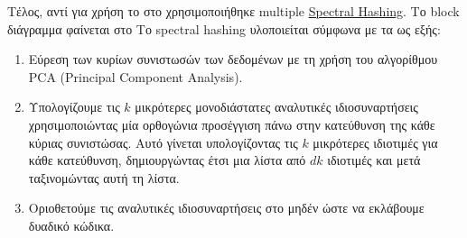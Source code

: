 Τέλος, αντί για χρήση \lsh{} το \citeyear{park2015query} στο \cite{park2015query} χρησιμοποιήθηκε multiple \href{https://en.wikipedia.org/wiki/Spectral_Hash}{Spectral Hashing}.
Το block διάγραμμα φαίνεται στο 
Το spectral hashing υλοποιείται σύμφωνα με τα \cite{weiss2009spectral,weiss2009spectral-blog} ως εξής:
\begin{enumerate}
	\item Εύρεση των κυρίων συνιστωσών των δεδομένων με τη χρήση του αλγορίθμου PCA (Principal Component Analysis).
	\item Υπολογίζουμε τις $k$ μικρότερες μονοδιάστατες αναλυτικές ιδιοσυναρτήσεις χρησιμοποιώντας μία ορθογώνια προσέγγιση πάνω στην κατεύθυνση της κάθε κύριας συνιστώσας.
	      Αυτό γίνεται υπολογίζοντας τις $k$ μικρότερες ιδιοτιμές για κάθε κατεύθυνση, δημιουργώντας έτσι μια λίστα από $dk$ ιδιοτιμές και μετά ταξινομώντας αυτή τη λίστα.
	\item Οριοθετούμε τις αναλυτικές ιδιοσυναρτήσεις στο μηδέν ώστε να εκλάβουμε δυαδικό κώδικα.
\end{enumerate}

\undef{\ls}
\undef{\lsh}
\forceendwrapfig{}
